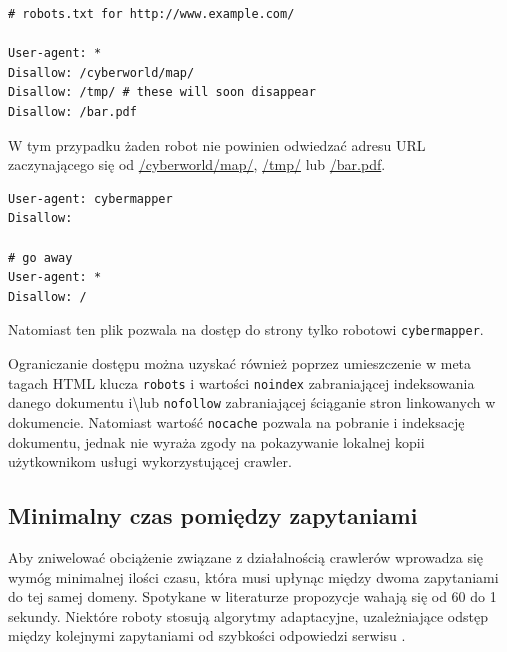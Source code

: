 \begin{lstlisting}[frame=single]
# robots.txt for http://www.example.com/

User-agent: *
Disallow: /cyberworld/map/
Disallow: /tmp/ # these will soon disappear
Disallow: /bar.pdf
\end{lstlisting}

W tym przypadku żaden robot nie powinien odwiedzać adresu URL zaczynającego się od \url{/cyberworld/map/}, \url{/tmp/} lub \url{/bar.pdf}.

\begin{lstlisting}[frame=single]
User-agent: cybermapper
Disallow:

# go away
User-agent: *
Disallow: /
\end{lstlisting}

Natomiast ten plik pozwala na dostęp do strony tylko robotowi \texttt{cybermapper}.

Ograniczanie dostępu można uzyskać również poprzez umieszczenie w meta tagach HTML klucza \texttt{robots} i wartości
\texttt{noindex} zabraniającej indeksowania danego dokumentu i\textbackslash lub \texttt{nofollow} zabraniającej ściąganie stron linkowanych w 
dokumencie. Natomiast wartość \texttt{nocache} pozwala na pobranie i indeksację dokumentu, jednak nie wyraża zgody na pokazywanie lokalnej kopii
użytkownikom usługi wykorzystującej crawler.


\subsection{Minimalny czas pomiędzy zapytaniami}
\label{subsec:minCzas}
Aby zniwelować obciążenie związane z działalnością crawlerów wprowadza się wymóg minimalnej ilości czasu, która musi upłynąc między dwoma
zapytaniami do tej samej domeny. Spotykane w literaturze propozycje wahają się od 60 do 1 sekundy. Niektóre roboty stosują algorytmy adaptacyjne,
uzależniające odstęp między kolejnymi zapytaniami od szybkości odpowiedzi serwisu \cite{webCrawling}.







